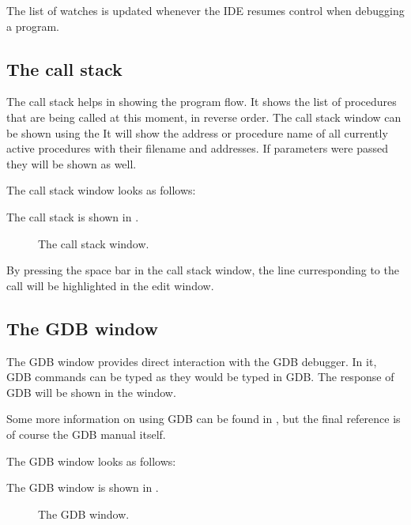 The list of watches is updated whenever the IDE resumes control when
debugging a program.
%
%
\subsection{The call stack}
\label{se:callstack}
The call stack helps in showing the program flow. It shows the list of
procedures that are being called at this moment, in reverse order.
The call stack window can be shown using the 
It will show the address or procedure name of all currently active 
procedures with their filename and addresses. If parameters were passed
they will be shown as well.
\begin{htmlonly}

The call stack window looks as follows:
\end{htmlonly}
\begin{latexonly}
The call stack is shown in .
\begin{figure}[ht]
\caption{The call stack window.}\label{fig:callstack}
\ifpdf
{}
\else
{}
\fi
\end{figure}
\end{latexonly}

By pressing the space bar in the call stack window, the line curresponding
to the call will be highlighted in the edit window.

\subsection{The GDB window}
\label{se:gdbwindow}
The GDB window provides direct interaction with the GDB debugger.
In it, GDB commands can be typed as they would be typed in GDB.
The response of GDB will be shown in the window.

Some more information on using GDB can be found in , but
the final reference is of course the GDB manual itself.

\begin{htmlonly}
The GDB window looks as follows:
\end{htmlonly}
\begin{latexonly}
The GDB window is shown in .
\begin{figure}[ht]
\caption{The GDB window.}\label{fig:gdbwin}
\ifpdf
{}
\else
{}
\fi
\end{figure}
\end{latexonly}

